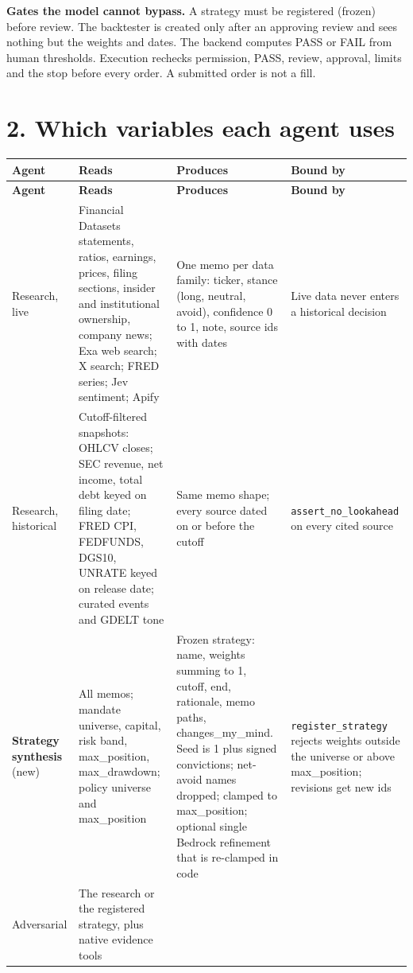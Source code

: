 \documentclass[11pt,a4paper]{article}
\begin{document}
\textbf{Gates the model cannot bypass.} A strategy must be registered (frozen) before review. The backtester is created only after an approving review and sees nothing but the weights and dates. The backend computes PASS or FAIL from human thresholds. Execution rechecks permission, PASS, review, approval, limits and the stop before every order. A submitted order is not a fill.

\newpage
\section*{2. Which variables each agent uses}

\small
\renewcommand{\arraystretch}{1.2}
\setlength{\LTleft}{0pt}\setlength{\LTright}{0pt}
\begin{longtable}{@{}R{2.2cm}R{4.4cm}R{4.4cm}R{4.2cm}@{}}
\toprule
\textbf{Agent} & \textbf{Reads} & \textbf{Produces} & \textbf{Bound by} \\
\midrule
\endfirsthead
\toprule
\textbf{Agent} & \textbf{Reads} & \textbf{Produces} & \textbf{Bound by} \\
\midrule
\endhead
\bottomrule
\endlastfoot
Research, live &
Financial Datasets statements, ratios, earnings, prices, filing sections, insider and institutional ownership, company news; Exa web search; X search; FRED series; Jev sentiment; Apify &
One memo per data family: ticker, stance (long, neutral, avoid), confidence 0 to 1, note, source ids with dates &
Live data never enters a historical decision \\
\addlinespace
Research, historical &
Cutoff-filtered snapshots: OHLCV closes; SEC revenue, net income, total debt keyed on filing date; FRED CPI, FEDFUNDS, DGS10, UNRATE keyed on release date; curated events and GDELT tone &
Same memo shape; every source dated on or before the cutoff &
\texttt{assert\_no\_lookahead} on every cited source \\
\addlinespace
\textbf{Strategy synthesis} (new) &
All memos; mandate universe, capital, risk band, max\_position, max\_drawdown; policy universe and max\_position &
Frozen strategy: name, weights summing to 1, cutoff, end, rationale, memo paths, changes\_my\_mind. Seed is 1 plus signed convictions; net-avoid names dropped; clamped to max\_position; optional single Bedrock refinement that is re-clamped in code &
\texttt{register\_strategy} rejects weights outside the universe or above max\_position; revisions get new ids \\
\addlinespace
Adversarial &
The research or the registered strategy, plus native evidence tools &

\end{longtable}
\end{document}
